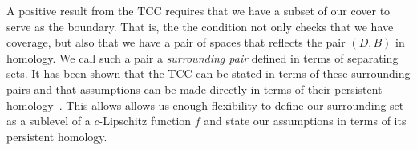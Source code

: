 
A positive result from the TCC requires that we have a subset of our cover to serve as the boundary.
That is, the the condition not only checks that we have coverage, but also that we have a pair of spaces that reflects the pair $(D, B)$ in homology.
We call such a pair a \emph{surrounding pair} defined in terms of separating sets.
It has been shown that the TCC can be stated in terms of these surrounding pairs and that assumptions can be made directly in terms of their persistent homology~\cite{cavanna2017when}.
This allows allows us enough flexibility to define our surrounding set as a sublevel of a $c$-Lipschitz function $f$ and state our assumptions in terms of its persistent homology.

%
